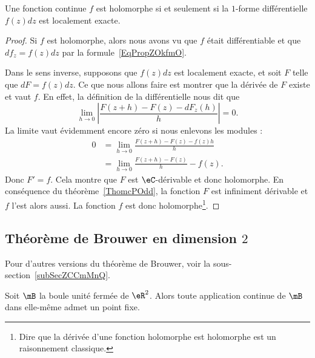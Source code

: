 \begin{proposition}\label{PropZOkfmO}
	Une fonction continue \( f\) est holomorphe si et seulement si la \( 1\)-forme différentielle \( f(z)dz\) est localement exacte.
\end{proposition}

\begin{proof}
	Si \( f\) est holomorphe, alors nous avons vu que \( f\) était différentiable et que \( df_{z}=f(z)dz\) par la formule~\ref{EqPropZOkfmO}.

	Dans le sens inverse, supposons que \( f(z)dz\) est localement exacte, et soit \( F\) telle que \( dF=f(z)dz\). Ce que nous allons faire est montrer que la dérivée de \( F\) existe et vaut \( f\). En effet, la définition de la différentielle nous dit que
	\begin{equation}
		\lim_{h\to 0} \left| \frac{ F(z+h)-F(z)-dF_z(h) }{ h } \right| =0.
	\end{equation}
	La limite vaut évidemment encore zéro si nous enlevons les modules :
	\begin{subequations}
		\begin{align}
			0 & =\lim_{h\to 0} \frac{ F(z+h)-F(z)-f(z)h }{ h } \\
			  & =\lim_{h\to 0} \frac{ F(z+h)-F(z) }{ h }-f(z).
		\end{align}
	\end{subequations}
	Donc \( F'=f\). Cela montre que \( F\) est \( \eC\)-dérivable et donc holomorphe. En conséquence du théorème~\ref{ThomcPOdd}, la fonction \( F\) est infiniment dérivable et \( f\) l'est alors aussi. La fonction \( f\) est donc holomorphe\footnote{Dire que la dérivée d'une fonction holomorphe est holomorphe est un raisonnement classique.}.
\end{proof}

\subsection{Théorème de Brouwer en dimension \texorpdfstring{\(  2\)}{2}}
Pour d'autres versions du théorème de Brouwer, voir la sous-section~\ref{subSecZCCmMnQ}.

\begin{theorem}     \label{ThoLVViheK}
	Soit \( \mB\) la boule unité fermée de \( \eR^2\). Alors toute application continue de \( \mB\) dans elle-même admet un point fixe.
\end{theorem}

